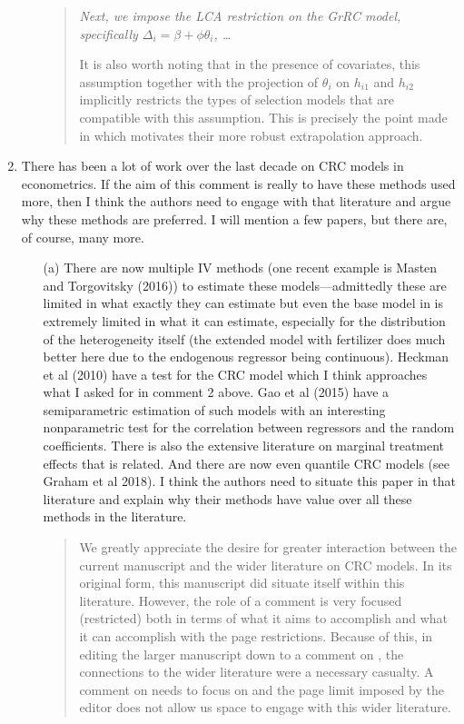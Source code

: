 \documentclass{article}[11pt]
\begin{document}
\begin{enumerate}
\begin{itemize}
\begin{quote}
    \emph{
    Next, we impose the LCA restriction on the GrRC model, specifically $\Delta_i=\beta+\phi \theta_i$, \dots}\newline
    
    It is also worth noting that in the presence of covariates, this assumption together with the projection of $\theta_i$ on $h_{i1}$ and $h_{i2}$ implicitly restricts the types of selection models that are compatible with this assumption. 
    This is precisely the point made in \citet{V2020} which motivates their more robust extrapolation approach. 
    \end{quote}
  \end{itemize}
  \item There has been a lot of work over the last decade on CRC models in econometrics. If the aim of this comment is really to have these methods used more, then I think the authors need to engage with that literature and argue why these methods are preferred. I will mention a few papers, but there are, of course, many more. 
  \begin{itemize}
      \item[(a)] There are now multiple IV methods (one recent example is Masten and Torgovitsky (2016)) to estimate these models---admittedly these are limited in what exactly they can estimate but even the base model in \citet{S2011} is extremely limited in what it can estimate, especially for the distribution of the heterogeneity itself (the extended model with fertilizer does much better here due to the endogenous regressor being continuous). Heckman et al (2010) have a test for the CRC model which I think approaches what I asked for in comment 2 above. Gao et al (2015) have a semiparametric estimation of such models with an interesting nonparametric test for the correlation between regressors and the random coefficients. There is also the extensive literature on marginal treatment effects that is related. And there are now even quantile CRC models (see Graham et al 2018). I think the authors need to situate this paper in that literature and explain why their methods have value over all these methods in the literature.
      \begin{quote}
          We greatly appreciate the desire for greater interaction between the current manuscript and the wider literature on CRC models. In its original form, this manuscript did situate itself within this literature. However, the role of a comment is very focused (restricted) both in terms of what it aims to accomplish and what it can accomplish with the page restrictions. Because of this, in editing the larger manuscript down to a comment on \citet{S2011}, the connections to the wider literature were a necessary casualty. A comment on \citet{S2011} needs to focus on \citet{S2011} and the page limit imposed by the editor does not allow us space to engage with this wider literature.

\end{quote}
\end{itemize}
\end{enumerate}
\end{document}
